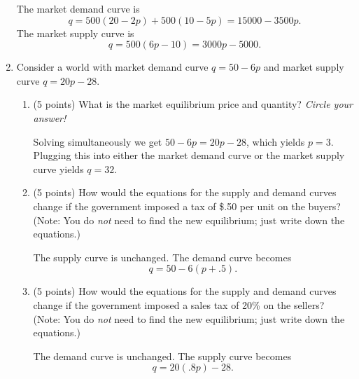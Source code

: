 \documentclass{article}
\begin{document}
\begin{enumerate}
\begin{KEY} The market demand curve is \[ q=500(20-2p)+500(10-5p)=15000-3500p.\] The market supply curve is \[q=500(6p-10)=3000p-5000.\] \end{KEY}














\item \begin{EXAM} Consider a world with market demand curve $q=50-6p$ and market supply curve $q=20p-28$. \end{EXAM}
    \begin{enumerate}

    \item \begin{EXAM}(5 points) What is the market equilibrium price and quantity? \emph{Circle your answer!} \vspace{4cm} \end{EXAM}

\begin{KEY} Solving simultaneously we get $50-6p=20p-28$, which yields $p=3$. Plugging this into either the market demand curve or the market supply curve yields $q=32$.  \end{KEY}


    \item \begin{EXAM}(5 points) How would the equations for the supply and demand curves change if the government imposed a tax of \$.50 per unit on the buyers? (Note: You do \emph{not} need to find the new equilibrium; just write down the equations.) \vspace{3cm} \end{EXAM}

\begin{KEY} The supply curve is unchanged. The demand curve becomes \[q=50-6(p+.5).\] \end{KEY}


    \item \begin{EXAM}(5 points) How would the equations for the supply and demand curves change if the government imposed a sales tax of 20\% on the sellers? (Note: You do \emph{not} need to find the new equilibrium; just write down the equations.) \vspace{2cm} \end{EXAM}

\begin{KEY} The demand curve is unchanged. The supply curve becomes \[q=20(.8p)-28.\] \end{KEY}

    \end{enumerate}

\end{enumerate}
\end{document}
